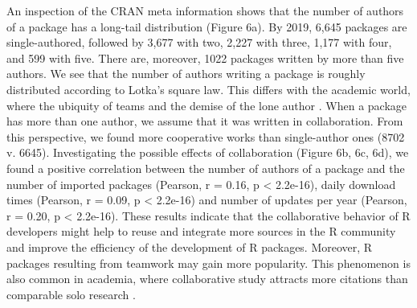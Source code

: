 An inspection of the CRAN meta information shows that the number of
authors of a package has a long-tail distribution (Figure 6a). By 2019,
6,645 packages are single-authored, followed by 3,677 with two, 2,227
with three, 1,177 with four, and 599 with five. There are, moreover,
1022 packages written by more than five authors. We see that the number
of authors writing a package is roughly distributed according to Lotka's
square law. This differs with the academic world, where the ubiquity of
teams and the demise of the lone author \citep{WuchtyJones-607}. When a
package has more than one author, we assume that it was written in
collaboration. From this perspective, we found more cooperative works
than single-author ones (8702 v. 6645). Investigating the possible
effects of collaboration (Figure 6b, 6c, 6d), we found a positive
correlation between the number of authors of a package and the number of
imported packages (Pearson, r = 0.16, p \textless{} 2.2e-16), daily
download times (Pearson, r = 0.09, p \textless{} 2.2e-16) and number of
updates per year (Pearson, r = 0.20, p \textless{} 2.2e-16). These
results indicate that the collaborative behavior of R developers might
help to reuse and integrate more sources in the R community and improve
the efficiency of the development of R packages. Moreover, R packages
resulting from teamwork may gain more popularity. This phenomenon is
also common in academia, where collaborative study attracts more
citations than comparable solo research \citep{WuchtyJones-607}.

